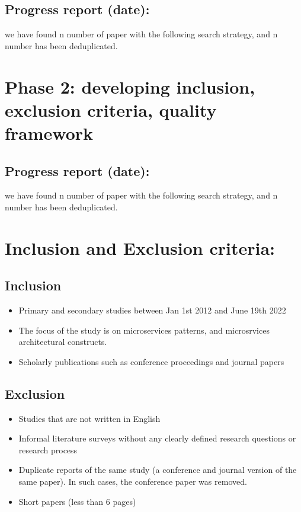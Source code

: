 \documentclass{article}
\theoremstyle{mytheoremstyle}
\theoremstyle{mytheoremstyle}
\theoremstyle{myproblemstyle}
\begin{document}
    \subsection{Progress report (date): }

     we have found n number of paper with the following search strategy, and n number has been deduplicated. 


     \section{Phase 2: developing inclusion, exclusion criteria, quality framework}

     \subsection{Progress report (date): }
 
      we have found n number of paper with the following search strategy, and n number has been deduplicated. 

      \section{Inclusion and Exclusion criteria:}

      \subsection{Inclusion}
      \begin{itemize}
        \item Primary and secondary studies between Jan 1st 2012 and June 19th 2022 
        \item The focus of the study is on microservices patterns, and microsrvices architectural constructs. 
        \item Scholarly publications such as conference proceedings and journal papers
      \end{itemize}

      \subsection{Exclusion}
      \begin{itemize}
        \item Studies that are not written in English
        \item Informal literature surveys without any clearly defined research questions or research process
        \item Duplicate reports of the same study (a conference and journal version of the same paper). In such cases, the conference paper was removed.
        \item Short papers (less than 6 pages)
      \end{itemize}
\end{document}
